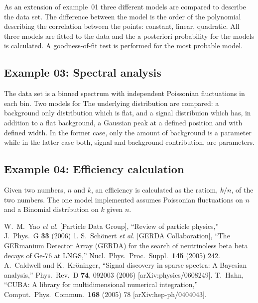 \documentclass[11pt, a4paper]{article}
\begin{document}
As an extension of example~01 three different models are compared to
describe the data set. The difference between the model is the order
of the polynomial describing the correlation between the points:
constant, linear, quadratic. All three models are fitted to the data
and the a posteriori probability for the models is calculated. A
goodness-of-fit test is performed for the most probable model.


\subsection{Example 03: Spectral analysis} 
\label{section:example03} 

The data set is a binned spectrum with independent Poissonian
fluctuations in each bin. Two models for The underlying distribution
are compared: a background only distribution which is flat, and a
signal distribuion which has, in addition to a flat background, a
Gaussian peak at a defined position and with defined width. In the
former case, only the amount of background is a parameter while in the
latter case both, signal and background contribution, are parameters. 


\subsection{Example 04: Efficiency calculation} 

Given two numbers, $n$ and $k$, an efficiency is calculated as the
ratiom, $k/n$, of the two numbers. The one model implemented assumes
Poissonian fluctuations on $n$ and a Binomial distribution on $k$
given $n$. 



\begin{thebibliography}{99}
%
  W.~M.~Yao {\it et al.}  [Particle Data Group],
  ``Review of particle physics,''
  J.\ Phys.\ G {\bf 33} (2006) 1.
%
  S.~Sch\"onert {\it et al.}  [GERDA Collaboration],
  ``The GERmanium Detector Array (GERDA) for the search of neutrinoless beta
  beta decays of Ge-76 at LNGS,''
  Nucl.\ Phys.\ Proc.\ Suppl.\  {\bf 145} (2005) 242.
%
  A.~Caldwell and K.~Kr\"oninger,
  ``Signal discovery in sparse spectra: A Bayesian analysis,''
  Phys.\ Rev.\  D {\bf 74}, 092003 (2006)
  [arXiv:physics/0608249].
%
  T.~Hahn, ``CUBA: A library for multidimensional numerical
  integration,'' Comput.\ Phys.\ Commun.\ {\bf 168} (2005) 78
  [arXiv:hep-ph/0404043].
\end{thebibliography}
\end{document}
